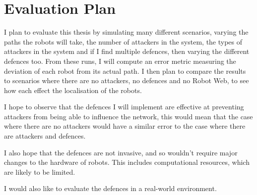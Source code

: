\chapter{Evaluation Plan}

I plan to evaluate this thesis by simulating many different scenarios, varying the paths the robots will take, the number of attackers in the system, the types of attackers in the system and if I find multiple defences, then varying the different defences too. From these runs, I will compute an error metric measuring the deviation of each robot from its actual path. I then plan to compare the results to scenarios where there are no attackers, no defences and no Robot Web, to see how each effect the localisation of the robots.

I hope to observe that the defences I will implement are effective at preventing attackers from being able to influence the network, this would mean that the case where there are no attackers would have a similar error to the case where there are attackers and defences.

I also hope that the defences are not invasive, and so wouldn't require major changes to the hardware of robots. This includes computational resources, which are likely to be limited.

I would also like to evaluate the defences in a real-world environment.